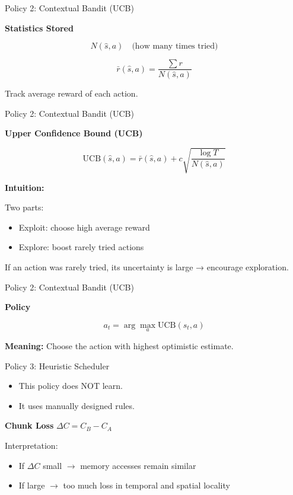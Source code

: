 \documentclass[Serif, 10pt, brown]{beamer}
\theoremstyle{example}
\theoremstyle{plain}
\begin{document}
\begin{frame}{Policy 2: Contextual Bandit (UCB)}

\textbf{Statistics Stored}

\[
N(\hat{s}, a) \quad \text{(how many times tried)}
\]

\[
\bar{r}(\hat{s}, a) =
\frac{\sum r}{N(\hat{s}, a)}
\]

Track average reward of each action.

\end{frame}

\begin{frame}{Policy 2: Contextual Bandit (UCB)}

\textbf{Upper Confidence Bound (UCB)}

\[
\text{UCB}(\hat{s}, a)
=
\bar{r}(\hat{s}, a)
+
c
\sqrt{
\frac{\log T}{N(\hat{s}, a)}
}
\]

\textbf{Intuition:}

Two parts:
\begin{itemize}
    \item Exploit: choose high average reward
    \item Explore: boost rarely tried actions
\end{itemize}

If an action was rarely tried,
its uncertainty is large → encourage exploration.

\end{frame}

\begin{frame}{Policy 2: Contextual Bandit (UCB)}

\textbf{Policy}

\[
a_t = \arg\max_a \text{UCB}(\hat{s}_t, a)
\]

\textbf{Meaning:}
Choose the action with highest optimistic estimate.

\end{frame}

\begin{frame}{Policy 3: Heuristic Scheduler}

    \begin{itemize}
        \item This policy does NOT learn.
        \item It uses manually designed rules.
    \end{itemize}

\vspace{1cm}

\textbf{Chunk Loss} $\Delta C = C_B - C_A$

Interpretation:
\begin{itemize}
    \item If $\Delta C$ small $\rightarrow$ memory accesses remain similar
    \item If large $\rightarrow$ too much loss in temporal and spatial locality
\end{itemize}


\end{frame}
\end{document}
